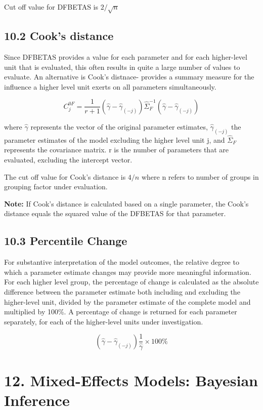 \documentclass[12pt,]{article}
\begin{document}
{Cut off value for DFBETAS is \(2/ \sqrt{n}\)

\subsection{10.2 Cook's distance}\label{cooks-distance}

Since DFBETAS provides a value for each parameter and for each
higher-level unit that is evaluated, this often results in quite a large
number of values to evaluate. An alternative is Cook's distnace-
provides a summary measure for the influence a higher level unit exerts
on all parameters simultaneously.

\[C_j^{0F} = \frac{1}{r +1}\left(\hat{\gamma} - \hat{\gamma}_{(-j)}\right) \hat{\Sigma}_F^{-1}\left(\hat{\gamma} - \hat{\gamma}_{(-j)}\right)\]

where \(\hat{\gamma}\) represents the vector of the original parameter
estimates, \(\hat{\gamma}_{(-j)}\) the parameter estimates of the model
excluding the higher level unit j, and \(\hat{\Sigma}_F\) represents the
covariance matrix. r is the number of parameters that are evaluated,
excluding the intercept vector.

The cut off value for Cook's distance is \(4/n\) where n refers to
number of groups in grouping factor under evaluation.

\textbf{Note:} If Cook's distance is calculated based on a single
parameter, the Cook's distance equals the squared value of the DFBETAS
for that parameter.

\subsection{10.3 Percentile Change}\label{percentile-change}

For substantive interpretation of the model outcomes, the relative
degree to which a parameter estimate changes may provide more meaningful
information. For each higher level group, the percentage of change is
calculated as the absolute difference between the parameter estimate
both including and excluding the higher-level unit, divided by the
parameter estimate of the complete model and multiplied by 100\%. A
percentage of change is returned for each parameter separately, for each
of the higher-level units under investigation.

\[\left(\hat{\gamma} - \hat{\gamma}_{(-j)}\right)\frac{1}{\hat{\gamma}} \times 100
\% \]

\section{12. Mixed-Effects Models: Bayesian
Inference}\label{mixed-effects-models-bayesian-inference}

}
\end{document}
